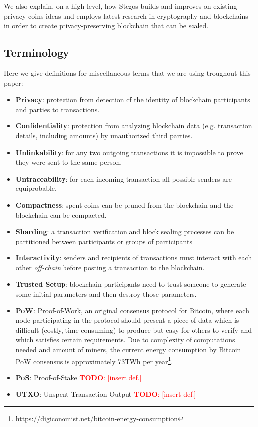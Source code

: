 \documentclass[a4paper, 10pt, conference]{ieeeconf}
\newcommand\todo[1]{\textcolor{red}{\textbf{TODO}: [#1]}}
\begin{document}
We also explain, on a high-level, how Stegos builds and improves on existing privacy coins ideas and employs latest research in cryptography and blockchains in order to create privacy-preserving blockchain that can be scaled. 

\subsection{Terminology}

Here we give definitions for miscellaneous terms that we are using troughout this paper:

\begin{itemize}

\item \textbf{Privacy}: protection from detection of the identity of blockchain participants and parties to transactions.
\item \textbf{Confidentiality}: protection from analyzing blockchain data (e.g. transaction details, including amounts) by unauthorized third parties.
\item \textbf{Unlinkability}: for any two outgoing transactions it is impossible to prove they were sent to the same person\cite{c2}.
\item \textbf{Untraceability}: for each incoming transaction all possible senders are equiprobable\cite{c2}.
\item \textbf{Compactness}: spent coins can be pruned from the blockchain and the blockchain can be compacted.
\item \textbf{Sharding}: a transaction verification and block sealing processes can be partitioned between participants or groups of participants.
\item \textbf{Interactivity}: senders and recipients of transactions must interact with each other \textit{off-chain} before posting a transaction to the blockchain.
\item \textbf{Trusted Setup}: blockchain participants need to trust someone to generate some initial parameters and then destroy those parameters.
\item \textbf{PoW}: Proof-of-Work, an original consensus protocol for Bitcoin, where each node participating in the protocol should present a piece of data which is difficult (costly, time-consuming) to produce but easy for others to verify and which satisfies certain requirements. Due to complexity of computations needed and amount of miners, the current energy consumption by Bitcoin PoW consensus is approximately 73TWh per year\footnote{https://digiconomist.net/bitcoin-energy-consumption}.
\item \textbf{PoS}: Proof-of-Stake \todo{insert def.}
\item \textbf{UTXO}: Unspent Transaction Output \todo{insert def.}

\end{itemize}
\end{document}
